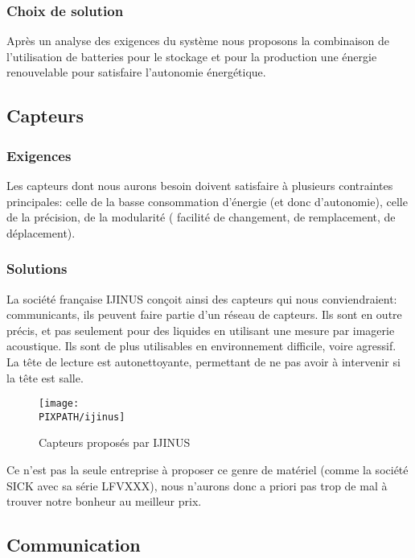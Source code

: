 \subsubsection{Choix de solution}
Après un analyse des exigences du syst\`eme nous proposons la combinaison de l'utilisation de batteries pour le stockage et pour la production une \'{e}nergie renouvelable pour satisfaire l'autonomie \'{e}nerg\'{e}tique.

\subsection{Capteurs}

\subsubsection{Exigences}
Les capteurs dont nous aurons besoin doivent satisfaire à plusieurs
contraintes principales: celle de la basse consommation d'énergie
(et donc d'autonomie), celle de la précision, de la modularité (
facilité de changement, de remplacement, de déplacement).

\subsubsection{Solutions}
La société française IJINUS conçoit ainsi des capteurs qui nous
conviendraient: communicants, ils peuvent faire partie d'un
réseau de capteurs. Ils sont en outre précis, et pas seulement
pour des liquides en utilisant une mesure par imagerie acoustique.
Ils sont de plus utilisables en environnement difficile, voire agressif.
La tête de lecture est autonettoyante, permettant de ne pas avoir
à intervenir si la tête est salle.

\begin{figure}[!h]
\begin{center}

\texttt{[image: \\PIXPATH/ijinus]}
\caption{Capteurs proposés par IJINUS}
\end{center}
\end{figure}

Ce n'est pas la seule entreprise à proposer ce genre de matériel (comme la société SICK avec sa série LFVXXX), nous
n'aurons donc a priori pas trop de mal à trouver notre bonheur au meilleur
prix.


\subsection{Communication}

